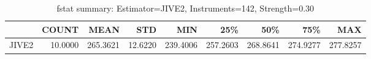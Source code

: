 \begin{table}[ht]
\centering
\caption{fstat summary: Estimator=JIVE2, Instruments=142, Strength=0.30}
\begin{tabular}{lrrrrrrrr}
\toprule
 & COUNT & MEAN & STD & MIN & 25\% & 50\% & 75\% & MAX \\
\midrule
JIVE2 & 10.0000 & 265.3621 & 12.6220 & 239.4006 & 257.2603 & 268.8641 & 274.9277 & 277.8257 \\
\bottomrule
\end{tabular}
\end{table}
